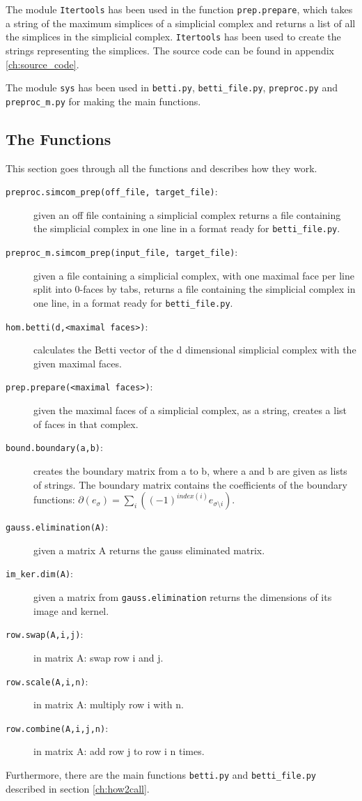 \documentclass[11pt,a4paper,twoside]{report}
\begin{document}
The module \texttt{Itertools} has been used in the function \texttt{prep.prepare}, which takes a string of the maximum simplices of a simplicial complex and returns a list of all the simplices in the simplicial complex. \texttt{Itertools} has been used to create the strings representing the simplices. The source code can be found in appendix \ref{ch:source_code}.

The module \texttt{sys} has been used in \texttt{betti.py}, \texttt{betti\_file.py}, \texttt{preproc.py} and \texttt{preproc\_m.py} for making the main functions.

\subsection{The Functions}

This section goes through all the functions and describes how they work.

\begin{description}
\item[\texttt{preproc.simcom\_prep(off\_file, target\_file)}:] given an off file containing a simplicial complex returns a file containing the simplicial complex in one line in a format ready for \texttt{betti\_file.py}. 
\item[\texttt{preproc\_m.simcom\_prep(input\_file, target\_file)}:] given a file containing a simplicial complex, with one maximal face per line split into 0-faces by tabs, returns a file containing the simplicial complex in one line, in a format ready for \texttt{betti\_file.py}.
\item[\texttt{hom.betti(d,<maximal faces>)}:] calculates the Betti vector of the d dimensional simplicial complex with the given maximal faces.
\item[\texttt{prep.prepare(<maximal faces>)}:] given the maximal faces of a simplicial complex, as a string, creates a list of faces in that complex.
\item[\texttt{bound.boundary(a,b)}:]creates the boundary matrix from a to b, where a and b are given as lists of strings. The boundary matrix contains the coefficients of the boundary functions: $\partial(e_{\sigma}) = \sum_i((-1)^{index(i)}e_{\sigma\setminus i})$.
\item[\texttt{gauss.elimination(A)}:] given a matrix A returns the gauss eliminated matrix.
\item[\texttt{im\_ker.dim(A)}:] given a matrix from \texttt{gauss.elimination} returns the dimensions of its image and kernel.
\item[\texttt{row.swap(A,i,j)}:] in matrix A: swap row i and j.
\item[\texttt{row.scale(A,i,n)}:] in matrix A: multiply row i with n.
\item[\texttt{row.combine(A,i,j,n)}:] in matrix A: add row j to row i n times.
\end{description}
Furthermore, there are the main functions \texttt{betti.py} and \texttt{betti\_file.py} described in section \ref{ch:how2call}.
\end{document}
